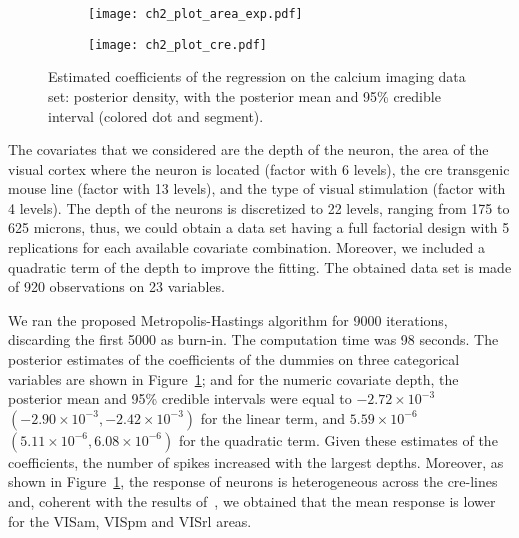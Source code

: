\begin{figure}[t]
	\centering
	\begin{subfigure}{\linewidth} \centering
		\texttt{[image: ch2\_plot\_area\_exp.pdf]}
	\end{subfigure}
	\begin{subfigure}{\linewidth} \centering
		\texttt{[image: ch2\_plot\_cre.pdf]}   \end{subfigure}
	\caption[Estimated coefficients of the regression on the calcium imaging data set.]{Estimated coefficients of the regression on the calcium imaging data set: posterior density, with the posterior mean and 95\% credible interval (colored dot and segment).} \label{fig:calcium_coeff}
\end{figure}


The covariates that we considered are the depth of the neuron, the area of the visual cortex where the neuron is located (factor with 6 levels), the cre transgenic mouse line (factor with 13 levels), and the type of visual stimulation (factor with 4 levels). 
The depth of the neurons is discretized to 22 levels, ranging from 175 to 625 microns, thus, we could obtain a data set having a full factorial design with 5 replications for each available covariate combination. Moreover, we included a quadratic term of the depth to improve the fitting. The obtained data set is made of 920 observations on 23 variables.


We ran the proposed Metropolis-Hastings algorithm for 9000 iterations, discarding the first 5000 as burn-in. The computation time was 98 seconds.
The posterior estimates of the coefficients of the dummies on three categorical variables are shown in Figure~\ref{fig:calcium_coeff}; and for the numeric covariate depth, the posterior mean and 95\% credible intervals were equal to $-2.72\times 10^{-3}$ $(-2.90\times 10^{-3}, -2.42\times 10^{-3})$ for the linear term, and $5.59\times 10^{-6}$ $(5.11\times 10^{-6}, 6.08\times 10^{-6})$ for the quadratic term.
Given these estimates of the coefficients, the number of spikes increased with the largest depths.
Moreover, as shown in Figure~\ref{fig:calcium_coeff}, the response of neurons is heterogeneous across the cre-lines and, coherent with the results of~\textcite{vries2020}, we obtained that the mean response is lower for the VISam, VISpm and VISrl areas.

